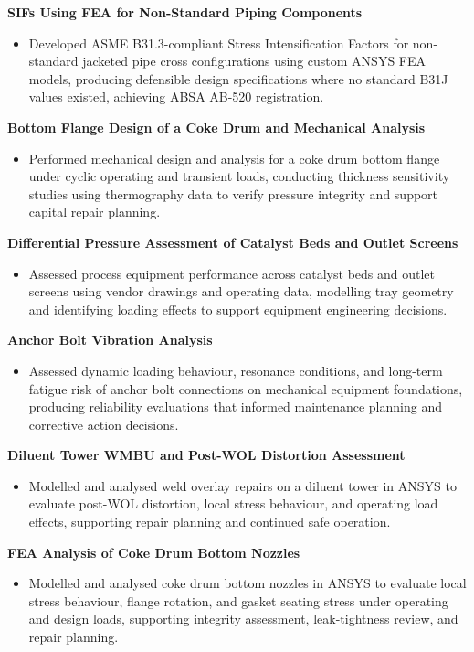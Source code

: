 \documentclass[10pt, letterpaper]{article}
\newcommand{\projhead}[1]{\vspace{5pt}\textbf{#1}\par\vspace{1pt}}
\begin{document}
\projhead{SIFs Using FEA for Non-Standard Piping Components}
\begin{itemize}
  \item Developed ASME B31.3-compliant Stress Intensification Factors for non-standard jacketed pipe cross configurations using custom ANSYS FEA models, producing defensible design specifications where no standard B31J values existed, achieving ABSA AB-520 registration.
\end{itemize}

\projhead{Bottom Flange Design of a Coke Drum and Mechanical Analysis}
\begin{itemize}
  \item Performed mechanical design and analysis for a coke drum bottom flange under cyclic operating and transient loads, conducting thickness sensitivity studies using thermography data to verify pressure integrity and support capital repair planning.
\end{itemize}

\projhead{Differential Pressure Assessment of Catalyst Beds and Outlet Screens}
\begin{itemize}
  \item Assessed process equipment performance across catalyst beds and outlet screens using vendor drawings and operating data, modelling tray geometry and identifying loading effects to support equipment engineering decisions.
\end{itemize}

\projhead{Anchor Bolt Vibration Analysis}
\begin{itemize}
  \item Assessed dynamic loading behaviour, resonance conditions, and long-term fatigue risk of anchor bolt connections on mechanical equipment foundations, producing reliability evaluations that informed maintenance planning and corrective action decisions.
\end{itemize}

\projhead{Diluent Tower WMBU and Post-WOL Distortion Assessment}
\begin{itemize}
  \item Modelled and analysed weld overlay repairs on a diluent tower in ANSYS to evaluate post-WOL distortion, local stress behaviour, and operating load effects, supporting repair planning and continued safe operation.
\end{itemize}

\projhead{FEA Analysis of Coke Drum Bottom Nozzles}
\begin{itemize}
  \item Modelled and analysed coke drum bottom nozzles in ANSYS to evaluate local stress behaviour, flange rotation, and gasket seating stress under operating and design loads, supporting integrity assessment, leak-tightness review, and repair planning.
\end{itemize}
\end{document}
